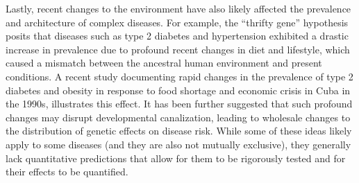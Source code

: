 \documentclass[11pt]{article}
\begin{document}
Lastly, recent changes to the environment have also likely affected the prevalence and architecture of complex diseases. For example, the “thrifty gene” hypothesis\cite{Neel:1962tj, Neel:1999tu} posits that diseases such as type 2 diabetes and hypertension exhibited a drastic increase in prevalence due to profound recent changes in diet and lifestyle, which caused a mismatch between the ancestral human environment and present conditions. A recent study documenting rapid changes in the prevalence of type 2 diabetes and obesity in response to food shortage and economic crisis in Cuba in the 1990s\cite{Franco:2013hb}, illustrates this effect. It has been further suggested that such profound changes may disrupt developmental canalization, leading to wholesale changes to the distribution of genetic effects on disease risk\cite{Gibson:2000vi, Gibson:2009ie}. While some of these ideas likely apply to some diseases (and they are also not mutually exclusive), they generally lack quantitative predictions that allow for them to be rigorously tested and for their effects to be quantified. 
\end{document}
